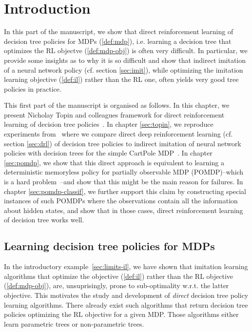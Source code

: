 \chapter{Introduction}\label{sec:intro-pomdp}
In this part of the manuscript, we show that direct reinforcement learning of decision tree policies for MDPs (\ref{def:mdp}), i.e. learning a decision tree that optimizes the RL objectve (\ref{def:mdp-obj}) is often very difficult.
In particular, we provide some insights as to why it is so difficult and show that indirect imitation of a neural network policy (cf. section \ref{sec:imit}), while optimizing the imitation learning objective (\ref{def:il}) rather than the RL one, often yields very good tree policies in practice.

This first part of the manuscript is organised as follows.
In this chapter, we present Nicholay Topin and colleagues framework for direct reinforcement learning of decision tree policies~\cite{topin2021iterative}.
In chapter \ref{sec:topin}, we reproduce experiments from~\cite{topin2021iterative} where we compare direct deep reinforcement learning (cf. section \ref{sec:drl}) of decision tree policies to indirect imitation of neural network policies with decision trees for the simple CartPole MDP~\cite{cartpole}.
In chapter \ref{sec:pomdp}, we show that this direct approach is equivalent to learning a deterministic memoryless policy for partially observable MDP (POMDP)\cite{POMDP,chap2}--which is a hard problem~\cite{littman1}--and show that this might be the main reason for failures.
In chapter \ref{sec:pomdp-classif}, we further support this claim by constructing special instances of such POMDPs where the observations contain all the information about hidden states, and show that in those cases, direct reinforcement learning of decision tree works well.  

\section{Learning decision tree policies for MDPs}\label{related-work-pomdp}
In the introductory example~\ref{sec:limits-il}, we have shown that imitation learning algorithms that optimize the objective (\ref{def:il}) rather than the RL objective (\ref{def:mdp-obj}), are, unsuprisingly, prone to sub-optimality w.r.t. the latter objective.
This motivates the study and development of \textit{direct} decision tree policy learning algorithms.
There already exist such algorithms that return decision tree policies optimizing the RL objective for a given MDP.
Those algorithms either learn parametric trees or non-parametric trees.

